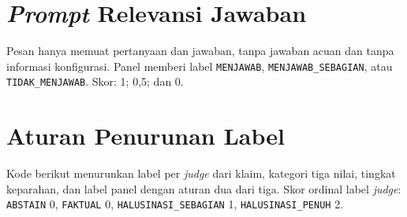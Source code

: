 



\section{\emph{Prompt} Relevansi Jawaban}
\label{subsec:lamp-a3}

Pesan hanya memuat pertanyaan dan jawaban, tanpa jawaban acuan dan tanpa informasi konfigurasi. Panel memberi label \texttt{MENJAWAB}, \texttt{MENJAWAB\_\allowbreak{}SEBAGIAN}, atau \texttt{TIDAK\_\allowbreak{}MENJAWAB}. Skor: 1; 0,5; dan 0.






\section{Aturan Penurunan Label}
\label{subsec:lamp-a4}

Kode berikut menurunkan label per \emph{judge} dari klaim, kategori tiga nilai, tingkat keparahan, dan label panel dengan aturan dua dari tiga. Skor ordinal label \emph{judge}: \texttt{ABSTAIN} 0, \texttt{FAKTUAL} 0, \texttt{HALUSINASI\_\allowbreak{}SEBAGIAN} 1, \texttt{HALUSINASI\_\allowbreak{}PENUH} 2.






